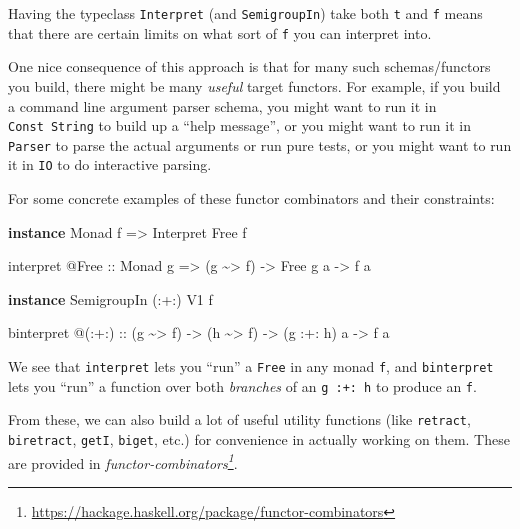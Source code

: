 \documentclass[]{article}
\newenvironment{Shaded}{}{}
\newcommand{\DataTypeTok}[1]{\textcolor[rgb]{0.56,0.13,0.00}{#1}}
\newcommand{\KeywordTok}[1]{\textcolor[rgb]{0.00,0.44,0.13}{\textbf{#1}}}
\newcommand{\NormalTok}[1]{#1}
\newcommand{\OperatorTok}[1]{\textcolor[rgb]{0.40,0.40,0.40}{#1}}
\newcommand{\OtherTok}[1]{\textcolor[rgb]{0.00,0.44,0.13}{#1}}
\renewcommand{\href}[2]{#2\footnote{\url{#1}}}
\begin{document}
Having the typeclass \texttt{Interpret} (and \texttt{SemigroupIn}) take both
\texttt{t} and \texttt{f} means that there are certain limits on what sort of
\texttt{f} you can interpret into.

One nice consequence of this approach is that for many such schemas/functors you
build, there might be many \emph{useful} target functors. For example, if you
build a command line argument parser schema, you might want to run it in
\texttt{Const\ String} to build up a ``help message'', or you might want to run
it in \texttt{Parser} to parse the actual arguments or run pure tests, or you
might want to run it in \texttt{IO} to do interactive parsing.

For some concrete examples of these functor combinators and their constraints:

\begin{Shaded}
\begin{Highlighting}[]
\KeywordTok{instance} \DataTypeTok{Monad}\NormalTok{ f }\OtherTok{=>} \DataTypeTok{Interpret} \DataTypeTok{Free}\NormalTok{ f}

\NormalTok{interpret }\OperatorTok{@}\DataTypeTok{Free}
\OtherTok{    ::} \DataTypeTok{Monad}\NormalTok{ g}
    \OtherTok{=>}\NormalTok{ (g }\OperatorTok{\textasciitilde{}>}\NormalTok{ f)}
    \OtherTok{{-}>} \DataTypeTok{Free}\NormalTok{ g a}
    \OtherTok{{-}>}\NormalTok{ f a}

\KeywordTok{instance} \DataTypeTok{SemigroupIn}\NormalTok{ (}\OperatorTok{:+:}\NormalTok{) }\DataTypeTok{V1}\NormalTok{ f}

\NormalTok{binterpret }\OperatorTok{@}\NormalTok{(}\OperatorTok{:+:}\NormalTok{)}
\OtherTok{    ::}\NormalTok{ (g }\OperatorTok{\textasciitilde{}>}\NormalTok{ f)}
    \OtherTok{{-}>}\NormalTok{ (h }\OperatorTok{\textasciitilde{}>}\NormalTok{ f)}
    \OtherTok{{-}>}\NormalTok{ (g }\OperatorTok{:+:}\NormalTok{ h) a}
    \OtherTok{{-}>}\NormalTok{ f a}
\end{Highlighting}
\end{Shaded}

We see that \texttt{interpret} lets you ``run'' a \texttt{Free} in any monad
\texttt{f}, and \texttt{binterpret} lets you ``run'' a function over both
\emph{branches} of an \texttt{g\ :+:\ h} to produce an \texttt{f}.

From these, we can also build a lot of useful utility functions (like
\texttt{retract}, \texttt{biretract}, \texttt{getI}, \texttt{biget}, etc.) for
convenience in actually working on them. These are provided in
\emph{\href{https://hackage.haskell.org/package/functor-combinators}{functor-combinators}}.
\end{document}
